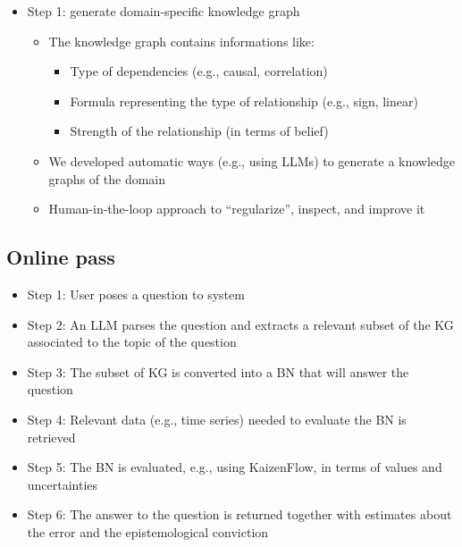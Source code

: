 \documentclass[11pt, reqno]{amsart}
\theoremstyle{definition}
\theoremstyle{remark}
\begin{document}
  \begin{itemize}
    \item Step 1: generate domain-specific knowledge graph

      \begin{itemize}
        \item The knowledge graph contains informations like:

          \begin{itemize}
            \item Type of dependencies (e.g., causal, correlation)

            \item Formula representing the type of relationship (e.g., sign, linear)

            \item Strength of the relationship (in terms of belief)
          \end{itemize}

        \item We developed automatic ways (e.g., using LLMs) to generate a
          knowledge graphs of the domain

        \item Human-in-the-loop approach to ``regularize'', inspect, and
          improve it
      \end{itemize}
  \end{itemize}

  \subsection{Online pass}

  \begin{itemize}

    \item Step 1: User poses a question to system

    \item Step 2: An LLM parses the question and extracts a relevant subset
      of the KG associated to the topic of the question

    \item Step 3: The subset of KG is converted into a BN that will answer
      the question

    \item Step 4: Relevant data (e.g., time series) needed to evaluate the
      BN is retrieved

    \item Step 5: The BN is evaluated, e.g., using KaizenFlow, in terms of
      values and uncertainties

    \item Step 6: The answer to the question is returned together with
      estimates about the error and the epistemological conviction
  \end{itemize}
\end{document}

